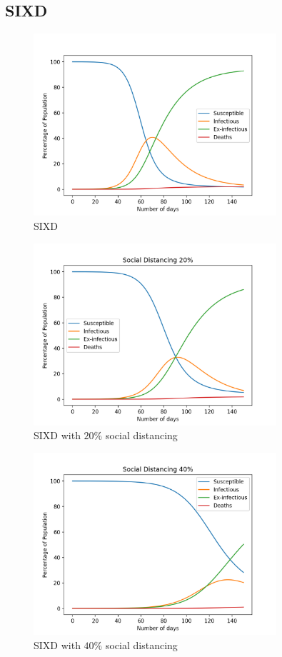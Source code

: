 \documentclass{article}
\begin{document}
	\subsection{SIXD}
	\begin{figure}[h!]
		\centering
		\includegraphics[width=90mm]{images/SIXD/standard.png}
		\caption{SIXD}
	\end{figure}
	\clearpage
	\begin{figure}[h!]
		\centering
		\includegraphics[width=90mm]{images/SIXD/social_distance_20.png}
		\caption{SIXD with $20\%$ social distancing}
	\end{figure}
	\begin{figure}[h!]
		\centering
		\includegraphics[width=90mm]{images/SIXD/social_distance_40.png}
		\caption{SIXD with $40\%$ social distancing}
	\end{figure}
\end{document}
